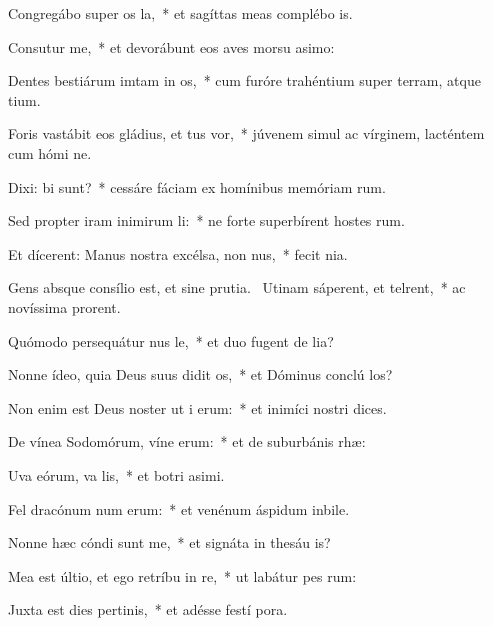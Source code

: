 \item Congregábo super os la,~* et sagíttas meas complébo  is.
\item Consutur me,~* et devorábunt eos aves morsu asimo:
\item Dentes bestiárum imtam in os,~* cum furóre trahéntium super terram, atque tium.
\item Foris vastábit eos gládius, et tus vor,~* júvenem simul ac vírginem, lacténtem cum hómi ne.
\item Dixi: bi sunt?~* cessáre fáciam ex homínibus memóriam rum.
\item Sed propter iram inimirum li:~* ne forte superbírent hostes rum.
\item Et dícerent: Manus nostra excélsa,  non nus,~* fecit  nia.
\item Gens absque consílio est, et sine prutia.~\pscross{} Utinam sáperent, et telrent,~* ac novíssima prorent.
\item Quómodo persequátur nus le,~* et duo fugent de lia?
\item Nonne ídeo, quia Deus suus didit os,~* et Dóminus conclú los?
\item Non enim est Deus noster ut i erum:~* et inimíci nostri  dices.
\item De vínea Sodomórum, víne erum:~* et de suburbánis rhæ:
\item Uva eórum, va lis,~* et botri asimi.
\item Fel dracónum num erum:~* et venénum áspidum inbile.
\item Nonne hæc cóndi sunt  me,~* et signáta in thesáu is?
\item Mea est últio, et ego retríbu in re,~* ut labátur pes rum:
\item Juxta est dies pertinis,~* et adésse festí pora.
